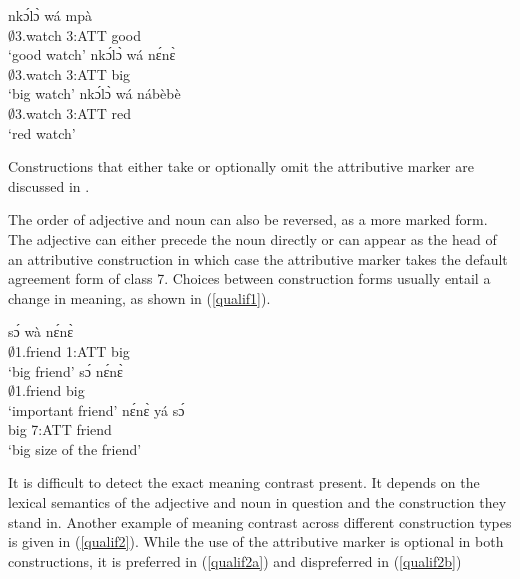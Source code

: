 \begin{exe}
\ex\label{qualib}
\begin{xlist}
\ex\label{qualib1}
 \gll  nkɔ́lɔ̀ wá mpà  \\
          $\emptyset$3.watch 3:ATT good  \\
    \trans `good watch'
\ex \label{qualib2}
  \gll   nkɔ́lɔ̀ wá nɛ́nɛ̀ \\
          $\emptyset$3.watch 3:ATT big \\
    \trans `big watch'
\ex \label{qualib3}
  \gll    nkɔ́lɔ̀ wá nábèbè \\
          $\emptyset$3.watch 3:ATT red \\
    \trans `red watch'
\end {xlist}
\end {exe}

\noindent Constructions that either take or optionally omit the attributive marker are discussed in .

The order of adjective and noun can also be reversed, as a  more marked form. The adjective can either precede the noun directly or can appear as the head of an attributive construction in which case the attributive marker takes the default agreement form of class 7. Choices between construction forms
usually entail a change in meaning, as shown in (\ref{qualif1}). 

\begin{exe}
\ex\label{qualif1}
\begin{xlist}
\ex\label{qualif1a}
 \gll  sɔ́ wà nɛ́nɛ̀  \\
          $\emptyset$1.friend 1:ATT big  \\
    \trans `big friend'
\ex \label{qualif1b}
  \gll   sɔ́ nɛ́nɛ̀\\
          $\emptyset$1.friend big \\
    \trans `important friend'
\ex \label{qualif1c}
  \gll    nɛ́nɛ̀ yá sɔ́ \\
          big 7:ATT friend \\
    \trans `big size of the friend'
\end {xlist}
\end {exe}

It is difficult to detect the exact meaning contrast present. It depends on the lexical semantics of the adjective and noun in question and the construction they stand in. Another example of meaning contrast across different construction types is given in (\ref{qualif2}). While the use of the attributive marker is optional in both constructions, it is preferred in (\ref{qualif2a}) and dispreferred in (\ref{qualif2b})

